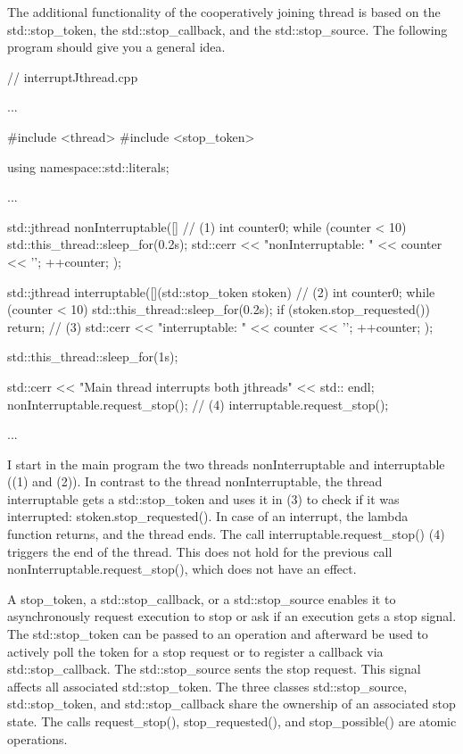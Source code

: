 The additional functionality of the cooperatively joining thread is based on the std::stop\_token, the std::stop\_callback, and the std::stop\_source. The following program should give you a general idea.


\begin{cpp}
// interruptJthread.cpp

...

#include <thread>
#include <stop_token>

using namespace::std::literals;

...

std::jthread nonInterruptable([]{ // (1)
	int counter{0};
	while (counter < 10){
		std::this_thread::sleep_for(0.2s);
		std::cerr << "nonInterruptable: " << counter << '\n';
		++counter;
	}
});

std::jthread interruptable([](std::stop_token stoken){ // (2)
	int counter{0};
	while (counter < 10){
		std::this_thread::sleep_for(0.2s);
		if (stoken.stop_requested()) return; // (3)
		std::cerr << "interruptable: " << counter << '\n';
		++counter;
	}
});

std::this_thread::sleep_for(1s);

std::cerr << "Main thread interrupts both jthreads" << std:: endl;
nonInterruptable.request_stop(); // (4)
interruptable.request_stop();

...
\end{cpp}

I start in the main program the two threads nonInterruptable and interruptable ((1) and (2)). In contrast to the thread nonInterruptable, the thread interruptable gets a std::stop\_token and uses it in (3) to check if it was interrupted: stoken.stop\_requested(). In case of an interrupt, the lambda function returns, and the thread ends. The call interruptable.request\_stop() (4) triggers the end of the thread. This does not hold for the previous call nonInterruptable.request\_stop(), which does not have an effect.




A stop\_token, a std::stop\_callback, or a std::stop\_source enables it to asynchronously request execution to stop or ask if an execution gets a stop signal. The std::stop\_token can be passed to an operation and afterward be used to actively poll the token for a stop request or to register a callback via std::stop\_callback. The std::stop\_source sents the stop request. This signal affects all associated std::stop\_token. The three classes std::stop\_source, std::stop\_token, and std::stop\_callback share the ownership of an associated stop state. The calls request\_stop(), stop\_requested(), and stop\_possible() are atomic operations.

